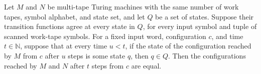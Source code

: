 \begin{theorem}
\label{Turing.MultiTapeTM.runFrom_eq_of_agreeOn}
\leanok
{}
Let $M$ and $N$ be multi-tape Turing machines with the same number of work tapes, symbol
alphabet, and state set, and let $Q$ be a set of states. Suppose their transition
functions agree at every state in $Q$, for every input symbol and tuple of scanned
work-tape symbols. For a fixed input word, configuration $c$, and time $t\in\mathbb{N}$,
suppose that at every time $u<t$, if the state of the configuration reached by $M$ from
$c$ after $u$ steps is some state $q$, then $q\in Q$. Then the configurations reached by
$M$ and $N$ after $t$ steps from $c$ are equal.
\end{theorem}
